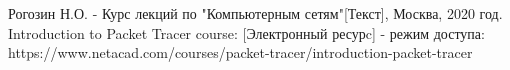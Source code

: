 \newpage
{}

\begin{thebibliography}{}
      Рогозин Н.О.  -  Курс лекций по "Компьютерным сетям"[Текст], Москва, 2020 год.
      Introduction to Packet Tracer course: [Электронный ресурc] - режим доступа: https://www.netacad.com/courses/packet-tracer/introduction-packet-tracer
\end{thebibliography}
